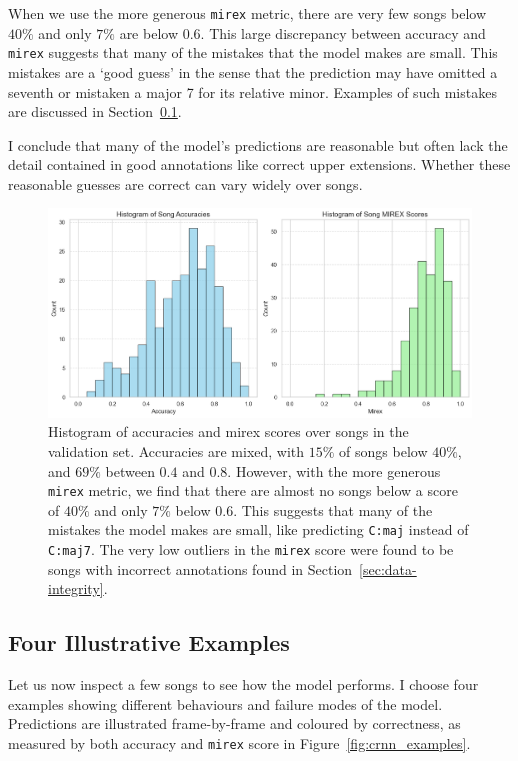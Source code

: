 When we use the more generous \texttt{mirex} metric, there are very few songs below $40\%$ and only $7\%$ are below $0.6$. This large discrepancy between accuracy and \texttt{mirex} suggests that many of the mistakes that the model makes are small. This mistakes are a `good guess' in the sense that the prediction may have omitted a seventh or mistaken a major 7 for its relative minor. Examples of such mistakes are discussed in Section~\ref{sec:crnn_examples}. 

I conclude that many of the model's predictions are reasonable but often lack the detail contained in good annotations like correct upper extensions. Whether these reasonable guesses are correct can vary widely over songs.

\begin{figure}[ht]
    \centering
    \includegraphics[width=1.0\textwidth]{figures/accuracy_mirex_histograms.png}
    \caption{Histogram of accuracies and mirex scores over songs in the validation set. Accuracies are mixed, with $15\%$ of songs below $40\%$, and $69\%$ between $0.4$ and $0.8$. However, with the more generous \texttt{mirex} metric, we find that there are almost no songs below a score of $40\%$ and only $7\%$ below $0.6$. This suggests that many of the mistakes the model makes are small, like predicting \texttt{C:maj} instead of \texttt{C:maj7}. The very low outliers in the \texttt{mirex} score were found to be songs with incorrect annotations found in Section~\ref{sec:data-integrity}.}\label{fig:crnn_song_hist}
\end{figure}

\subsection{Four Illustrative Examples}\label{sec:crnn_examples}

Let us now inspect a few songs to see how the model performs. I choose four examples showing different behaviours and failure modes of the model. Predictions are illustrated frame-by-frame and coloured by correctness, as measured by both accuracy and \texttt{mirex} score in Figure~\ref{fig:crnn_examples}. 

